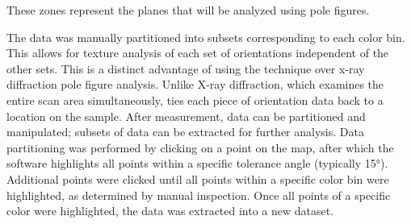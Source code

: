 %	
%
%		
%
%		
%		
%		
%		
%		
These zones represent the planes that will be analyzed using pole figures.

The data was manually partitioned into subsets corresponding to  each color bin. This
allows for texture analysis of each set of orientations independent of the other sets.
This is a distinct advantage of using the  technique over x-ray diffraction pole
figure analysis. Unlike X-ray diffraction, which examines the entire scan area
simultaneously,   ties each piece of orientation data back to a location on the
sample. After measurement, data can be partitioned and manipulated; subsets of data can be
extracted for further analysis. Data partitioning was performed by clicking on a point on
the map, after which the software highlights all points within a specific tolerance angle
(typically 15\si{\degree}). Additional points were clicked until all points within a
specific color bin were highlighted, as determined by manual inspection. Once all points
of a specific color were highlighted, the data was extracted into a new dataset. 

